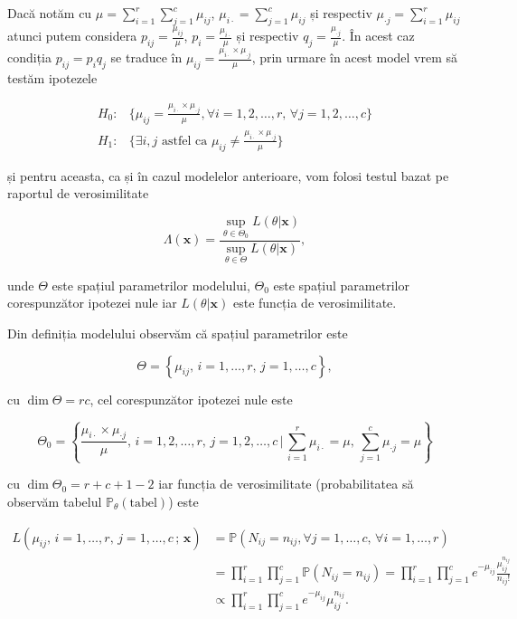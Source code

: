 \documentclass[]{article}
\begin{document}
\normalsize

Dacă notăm cu \(\mu = \sum_{i = 1}^{r}\sum_{j = 1}^{c}\mu_{ij}\),
\(\mu_{i\cdot}=\sum_{j = 1}^{c}\mu_{ij}\) și respectiv
\(\mu_{\cdot j} = \sum_{i = 1}^{r}\mu_{ij}\) atunci putem considera
\(p_{ij} = \frac{\mu_{ij}}{\mu}\), \(p_{i} = \frac{\mu_{i\cdot}}{\mu}\)
și respectiv \(q_{j} = \frac{\mu_{\cdot j}}{\mu}\). În acest caz
condiția \(p_{ij} = p_{i}q_{j}\) se traduce în
\(\mu_{ij} = \frac{\mu_{i\cdot}\times \mu_{\cdot j}}{\mu}\), prin urmare
în acest model vrem să testăm ipotezele

\begin{align*}
  H_0: & \{\mu_{ij} = \frac{\mu_{i\cdot}\times \mu_{\cdot j}}{\mu}, \forall i = 1,2,\ldots,r,\,\forall j = 1,2,\ldots, c\}\\
  H_1: & \{\exists i, j \text{ astfel ca } \mu_{ij} \neq \frac{\mu_{i\cdot}\times \mu_{\cdot j}}{\mu}\} 
\end{align*}

și pentru aceasta, ca și în cazul modelelor anterioare, vom folosi
testul bazat pe raportul de verosimilitate

\[
  \Lambda(\mathbf{x})=\frac{\sup_{\theta\in\Theta_0}L(\theta|\mathbf{x})}{\sup_{\theta\in\Theta}L(\theta|\mathbf{x})},
\]

unde \(\Theta\) este spațiul parametrilor modelului, \(\Theta_0\) este
spațiul parametrilor corespunzător ipotezei nule iar
\(L(\theta|\mathbf{x})\) este funcția de verosimilitate.

Din definiția modelului observăm că spațiul parametrilor este

\[
\Theta = \left\{\mu_{ij},\,i = 1,\ldots,r,\,j = 1,\ldots,c\right\},
\]

cu \(\dim{\Theta} = rc\), cel corespunzător ipotezei nule este

\[
\Theta_0 = \left\{\frac{\mu_{i\cdot}\times \mu_{\cdot j}}{\mu},\, i = 1,2,\ldots,r,\,j = 1,2,\ldots, c\,|\,\sum_{i = 1}^{r}\mu_{i\cdot} = \mu,\,\sum_{j = 1}^{c}\mu_{\cdot j} = \mu\right\}
\]

cu \(\dim{\Theta_0} = r+c+1-2\) iar funcția de verosimilitate
(probabilitatea să observăm tabelul
\(\mathbb{P}_{\theta}(\text{tabel})\)) este

\begin{align*}
  L(\mu_{ij},\,i = 1,\ldots, r,\, j = 1,\ldots,c\,;\,\mathbf{x}) &= \mathbb{P}(N_{ij} = n_{ij},\forall j = 1,\ldots,c,\, \forall i = 1,\ldots, r) \\
    &= \prod_{i = 1}^{r}\prod_{j = 1}^{c}\mathbb{P}(N_{ij} = n_{ij}) = \prod_{i = 1}^{r}\prod_{j = 1}^{c}e^{-\mu_{ij}}\frac{\mu_{ij}^{n_{ij}}}{n_{ij}!}\\
    &\propto \prod_{i = 1}^{r}\prod_{j = 1}^{c}e^{-\mu_{ij}}\mu_{ij}^{n_{ij}}.
\end{align*}
\end{document}
